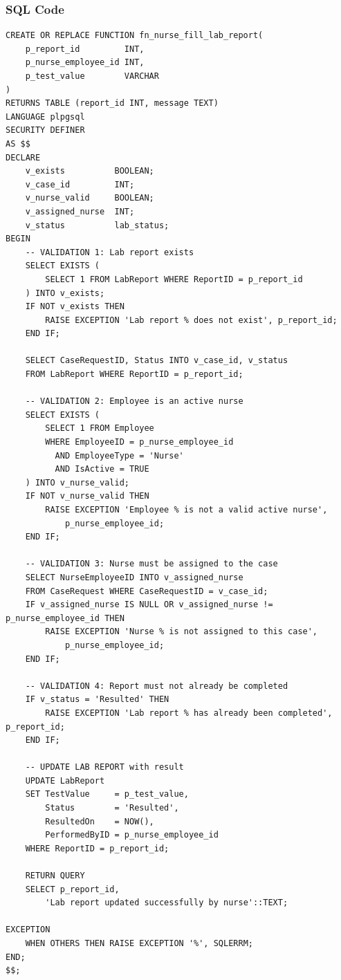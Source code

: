 \documentclass{article}
\begin{document}
\subsubsection{SQL Code}

\begin{lstlisting}
CREATE OR REPLACE FUNCTION fn_nurse_fill_lab_report(
    p_report_id         INT,
    p_nurse_employee_id INT,
    p_test_value        VARCHAR
)
RETURNS TABLE (report_id INT, message TEXT)
LANGUAGE plpgsql
SECURITY DEFINER
AS $$
DECLARE
    v_exists          BOOLEAN;
    v_case_id         INT;
    v_nurse_valid     BOOLEAN;
    v_assigned_nurse  INT;
    v_status          lab_status;
BEGIN
    -- VALIDATION 1: Lab report exists
    SELECT EXISTS (
        SELECT 1 FROM LabReport WHERE ReportID = p_report_id
    ) INTO v_exists;
    IF NOT v_exists THEN
        RAISE EXCEPTION 'Lab report % does not exist', p_report_id;
    END IF;

    SELECT CaseRequestID, Status INTO v_case_id, v_status
    FROM LabReport WHERE ReportID = p_report_id;

    -- VALIDATION 2: Employee is an active nurse
    SELECT EXISTS (
        SELECT 1 FROM Employee
        WHERE EmployeeID = p_nurse_employee_id
          AND EmployeeType = 'Nurse'
          AND IsActive = TRUE
    ) INTO v_nurse_valid;
    IF NOT v_nurse_valid THEN
        RAISE EXCEPTION 'Employee % is not a valid active nurse',
            p_nurse_employee_id;
    END IF;

    -- VALIDATION 3: Nurse must be assigned to the case
    SELECT NurseEmployeeID INTO v_assigned_nurse
    FROM CaseRequest WHERE CaseRequestID = v_case_id;
    IF v_assigned_nurse IS NULL OR v_assigned_nurse != p_nurse_employee_id THEN
        RAISE EXCEPTION 'Nurse % is not assigned to this case',
            p_nurse_employee_id;
    END IF;

    -- VALIDATION 4: Report must not already be completed
    IF v_status = 'Resulted' THEN
        RAISE EXCEPTION 'Lab report % has already been completed', p_report_id;
    END IF;

    -- UPDATE LAB REPORT with result
    UPDATE LabReport
    SET TestValue     = p_test_value,
        Status        = 'Resulted',
        ResultedOn    = NOW(),
        PerformedByID = p_nurse_employee_id
    WHERE ReportID = p_report_id;

    RETURN QUERY
    SELECT p_report_id,
        'Lab report updated successfully by nurse'::TEXT;

EXCEPTION
    WHEN OTHERS THEN RAISE EXCEPTION '%', SQLERRM;
END;
$$;
\end{lstlisting}
\end{document}
